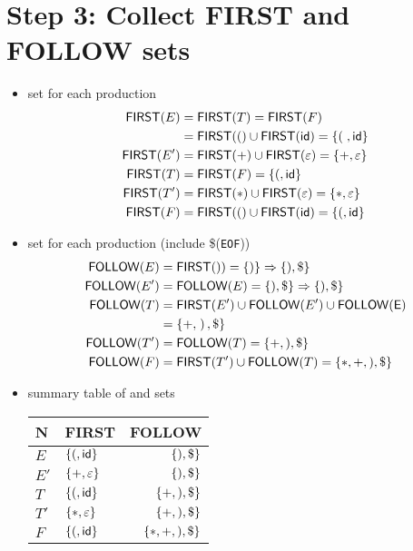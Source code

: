 \section*{Step 3: Collect FIRST and FOLLOW sets}
\begin{itemize}
\item {} set for each production
  \begin{align*}
    \mfn{first}(E)  &= \mfn{first}(T) = \mfn{first}(F) \\
                    &= \mfn{first}(() \cup \mfn{first}(\mathsf{id})
                      = \mset{\left(\right.,\mathsf{id}} \\
    \mfn{first}(E') &= \mfn{first}(+)\cup\mfn{first}(\varepsilon)
                      = \mset{+,\varepsilon}                  \\
    \mfn{first}(T)  &= \mfn{first}(F) = \mset{(,\mathsf{id}}  \\
    \mfn{first}(T') &= \mfn{first}(*)\cup\mfn{first}(\varepsilon)
                      = \mset{*,\varepsilon}  \\
    \mfn{first}(F)  &= \mfn{first}(()\cup\mfn{first}(\mathsf{id})
                      = \mset{(,\mathsf{id}}
  \end{align*}
\item {} set for each production (include \$(\texttt{EOF}))
  \begin{align*}
    \mfn{follow}(E)  &= \mfn{first}()) = \mset{)} \Rightarrow \mset{), \$}     \\
    \mfn{follow}(E') &= \mfn{follow}(E) = \mset{), \$} \Rightarrow \mset{), \$}\\
    \mfn{follow}(T)  &= \mfn{first}(E')\cup\mfn{follow}(E')\cup\mfn{follow(E)} \\
                     &= \mset{+, \left.\right), \$} \\
    \mfn{follow}(T') &= \mfn{follow}(T) = \mset{+, ), \$}\\
    \mfn{follow}(F)  &= \mfn{first}(T')\cup\mfn{follow}(T)= \mset{*, +, ), \$}
    \end{align*}
  \item summary table of  and  sets
    \begin{center}
      \begin{tabular}{l|l|r}
        \hline
        N  & \textsf{FIRST} & \textsf{FOLLOW} \\
        \hline
        \(E\)   & \(\{(,\mathsf{id}\}\) & \(\{), \$\}\) \\
        \(E'\)  & \(\{+,\varepsilon\}\) & \(\{), \$\}\) \\
        \(T\)   & \(\{(,\mathsf{id}\}\) & \(\{+, ), \$\}\) \\
        \(T'\)  & \(\{*,\varepsilon\}\) & \(\{+, ), \$\}\) \\
        \(F\)   & \(\{(,\mathsf{id}\}\) & \(\{*, +, ), \$\}\) \\
        \hline
      \end{tabular}
  \end{center}
\end{itemize}


